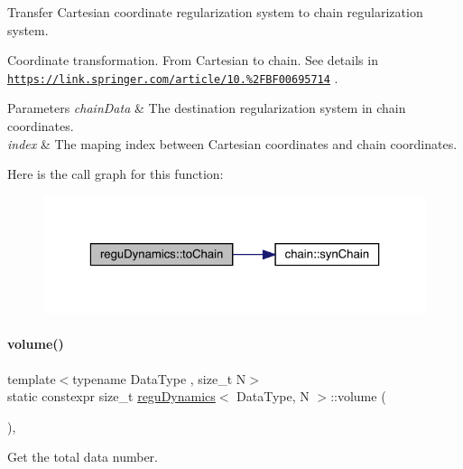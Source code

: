 Transfer Cartesian coordinate regularization system to chain regularization system. 

Coordinate transformation. From Cartesian to chain. See details in \href{https://link.springer.com/article/10.1007%2FBF00695714}{\tt https\+://link.\+springer.\+com/article/10.\+1007\%2\+F\+B\+F00695714} . 
\begin{DoxyParams}{Parameters}
{\em chain\+Data} & The destination regularization system in chain coordinates. \\
\hline
{\em index} & The maping index between Cartesian coordinates and chain coordinates. \\
\hline
\end{DoxyParams}
Here is the call graph for this function\+:\nopagebreak
\begin{figure}[H]
\begin{center}
\leavevmode
\includegraphics[width=323pt]{classregu_dynamics_aae4e77bbbb00f0bdddb396047f1c0fc2_cgraph}
\end{center}
\end{figure}
\mbox{\label{classregu_dynamics_a3a00b2009ce88898871ca024c30c6882}} 
\paragraph{\texorpdfstring{volume()}{volume()}}
{\footnotesize\ttfamily template$<$typename Data\+Type , size\+\_\+t N$>$ \\
static constexpr size\+\_\+t \mbox{\hyperlink{classregu_dynamics}{regu\+Dynamics}}$<$ Data\+Type, N $>$\+::volume (\begin{DoxyParamCaption}{ }\end{DoxyParamCaption})\hspace{0.3cm}{\ttfamily [inline]}, {\ttfamily [static]}}



Get the total data number. 

